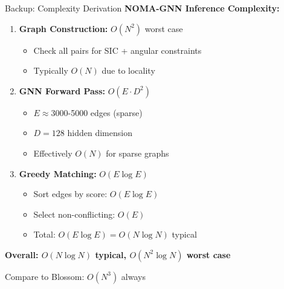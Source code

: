 \documentclass[aspectratio=169]{beamer}
\begin{document}
\begin{frame}{Backup: Complexity Derivation}
    \textbf{NOMA-GNN Inference Complexity:}
    \begin{enumerate}
        \item \textbf{Graph Construction:} $O(N^2)$ worst case
        \begin{itemize}
            \item Check all pairs for SIC + angular constraints
            \item Typically $O(N)$ due to locality
        \end{itemize}
        
        \item \textbf{GNN Forward Pass:} $O(E \cdot D^2)$
        \begin{itemize}
            \item $E \approx 3000$-5000 edges (sparse)
            \item $D = 128$ hidden dimension
            \item Effectively $O(N)$ for sparse graphs
        \end{itemize}
        
        \item \textbf{Greedy Matching:} $O(E \log E)$
        \begin{itemize}
            \item Sort edges by score: $O(E \log E)$
            \item Select non-conflicting: $O(E)$
            \item Total: $O(E \log E) = O(N \log N)$ typical
        \end{itemize}
    \end{enumerate}
    
    \vspace{0.2cm}
    
    \textbf{Overall: $O(N \log N)$ typical, $O(N^2 \log N)$ worst case}
    
    \vspace{0.2cm}
    
    Compare to Blossom: $O(N^3)$ always
\end{frame}
\end{document}
